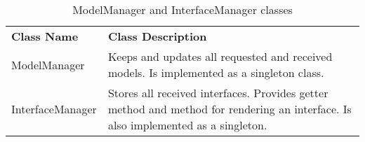 \begin{table}[htbp]
  \centering
  \caption{ModelManager and InterfaceManager classes}
  \label{tab:uipManagers}
 \renewcommand{\arraystretch}{1.2}
    \begin{tabularx}{\textwidth}{p{2.5cm}|X}
    \rowcolor{mygray}
    \textbf{Class Name} & \textbf{Class Description} \\
       ModelManager & Keeps and updates all requested and received models. Is implemented as a singleton class. \\ \hline
       \hspace{0pt}InterfaceManager & Stores all received interfaces. Provides getter method and method for rendering an interface. Is also implemented as a singleton.\\
    \end{tabularx}%
\end{table}%